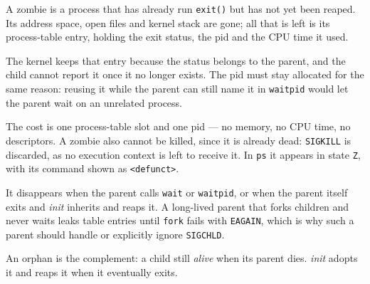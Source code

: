 A zombie is a process that has already run \texttt{exit()} but has not yet been reaped.
Its address space, open files and kernel stack are gone; all that is left is its
process-table entry, holding the exit status, the pid and the CPU time it used.

The kernel keeps that entry because the status belongs to the parent, and the child
cannot report it once it no longer exists. The pid must stay allocated for the same
reason: reusing it while the parent can still name it in \texttt{waitpid} would let the
parent wait on an unrelated process.

The cost is one process-table slot and one pid --- no memory, no CPU time, no
descriptors. A zombie also cannot be killed, since it is already dead: \texttt{SIGKILL}
is discarded, as no execution context is left to receive it. In \texttt{ps} it appears in
state \texttt{Z}, with its command shown as \texttt{<defunct>}.

It disappears when the parent calls \texttt{wait} or \texttt{waitpid}, or when the parent
itself exits and \emph{init} inherits and reaps it. A long-lived parent that forks
children and never waits leaks table entries until \texttt{fork} fails with
\texttt{EAGAIN}, which is why such a parent should handle or explicitly ignore
\texttt{SIGCHLD}.

An orphan is the complement: a child still \emph{alive} when its parent dies.
\emph{init} adopts it and reaps it when it eventually exits.

